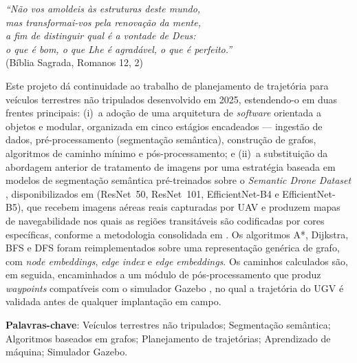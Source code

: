 \documentclass[
    12pt,
    openright,
    oneside,
    a4paper,
    english,
    brazil
]{abntex2}
\begin{document}
\begin{epigrafe}
    \vspace*{\fill}
    \begin{flushright}
        \textit{``Não vos amoldeis às estruturas deste mundo,\\
        mas transformai-vos pela renovação da mente,\\
        a fim de distinguir qual é a vontade de Deus:\\
        o que é bom, o que Lhe é agradável, o que é perfeito.''}\\
        (Bíblia Sagrada, Romanos 12, 2)
    \end{flushright}
\end{epigrafe}

\setlength{\absparsep}{18pt}
\begin{resumo}
Este projeto dá continuidade ao trabalho de planejamento de trajetória para veículos terrestres não tripulados desenvolvido em 2025, estendendo-o em duas frentes principais: (i)~a adoção de uma arquitetura de \textit{software} orientada a objetos e modular, organizada em cinco estágios encadeados --- ingestão de dados, pré-processamento (segmentação semântica), construção de grafos, algoritmos de caminho mínimo e pós-processamento; e (ii)~a substituição da abordagem anterior de tratamento de imagens por uma estratégia baseada em modelos de segmentação semântica pré-treinados sobre o \textit{Semantic Drone Dataset} \cite{drone_dataset}, disponibilizados em \cite{junior2024_models} (ResNet~50, ResNet~101, EfficientNet-B4 e EfficientNet-B5), que recebem imagens aéreas reais capturadas por UAV e produzem mapas de navegabilidade nos quais as regiões transitáveis são codificadas por cores específicas, conforme a metodologia consolidada em \cite{junior2025_rrt}. Os algoritmos A*, Dijkstra, BFS e DFS foram reimplementados sobre uma representação genérica de grafo, com \textit{node embeddings}, \textit{edge index} e \textit{edge embeddings}. Os caminhos calculados são, em seguida, encaminhados a um módulo de pós-processamento que produz \textit{waypoints} compatíveis com o simulador Gazebo \cite{koenig2004}, no qual a trajetória do UGV é validada antes de qualquer implantação em campo.

\textbf{Palavras-chave}: Veículos terrestres não tripulados; Segmentação semântica; Algoritmos baseados em grafos; Planejamento de trajetórias; Aprendizado de máquina; Simulador Gazebo.
\end{resumo}
\end{document}
